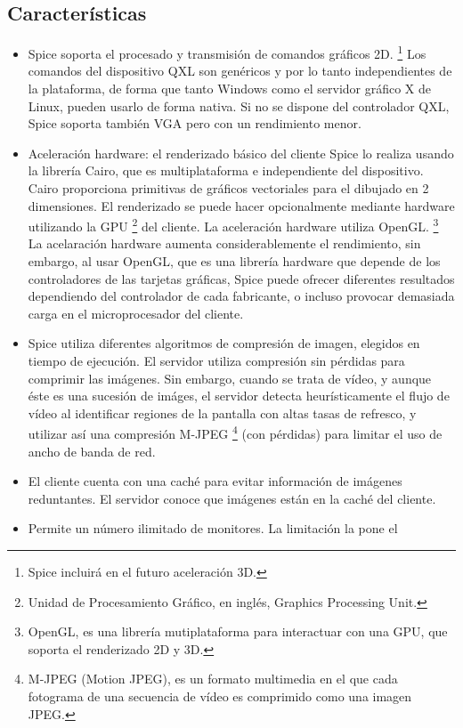 \documentclass[spanisheDIVcalc,twoside,parskip-,pointlessnumbers,final]{scrbook}
\begin{document}
\subsection{Características}
\begin{itemize}
\item Spice soporta el procesado y transmisión de comandos gráficos 2D.%
\footnote{Spice incluirá en el futuro aceleración 3D.%
} Los comandos del dispositivo QXL son genéricos y por lo tanto independientes
de la plataforma, de forma que tanto Windows como el servidor gráfico
X de Linux, pueden usarlo de forma nativa. Si no se dispone del controlador
QXL, Spice soporta también VGA pero con un rendimiento menor.
\item Aceleración hardware: el renderizado básico del cliente Spice lo realiza
usando la librería Cairo, que es multiplataforma e independiente del
dispositivo. Cairo proporciona primitivas de gráficos vectoriales
para el dibujado en 2 dimensiones. El renderizado se puede hacer opcionalmente
mediante hardware utilizando la GPU%
\footnote{Unidad de Procesamiento Gráfico, en inglés, Graphics Processing Unit.%
} del cliente. La aceleración hardware utiliza OpenGL.%
\footnote{OpenGL, es una librería mutiplataforma para interactuar con una GPU,
que soporta el renderizado 2D y 3D.%
} La acelaración hardware aumenta considerablemente el rendimiento,
sin embargo, al usar OpenGL, que es una librería hardware que depende
de los controladores de las tarjetas gráficas, Spice puede ofrecer
diferentes resultados dependiendo del controlador de cada fabricante,
o incluso provocar demasiada carga en el microprocesador del cliente.
\item Spice utiliza diferentes algoritmos de compresión de imagen, elegidos
en tiempo de ejecución. El servidor utiliza compresión sin pérdidas
para comprimir las imágenes. Sin embargo, cuando se trata de vídeo,
y aunque éste es una sucesión de imáges, el servidor detecta heurísticamente
el flujo de vídeo al identificar regiones de la pantalla con altas
tasas de refresco, y utilizar así una compresión M-JPEG%
\footnote{M-JPEG (Motion JPEG), es un formato multimedia en el que cada fotograma
de una secuencia de vídeo es comprimido como una imagen JPEG.%
} (con pérdidas) para limitar el uso de ancho de banda de red.
\item El cliente cuenta con una caché para evitar información de imágenes
reduntantes. El servidor conoce que imágenes están en la caché del
cliente.
\item Permite un número ilimitado de monitores. La limitación la pone el

\end{itemize}
\end{document}
